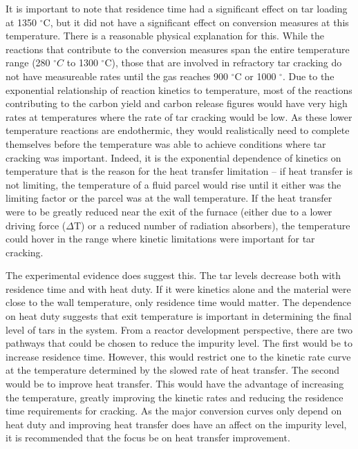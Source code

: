 \documentclass[11pt,twocolumn]{article}
\begin{document}
It is important to note that residence time had a significant effect on tar loading at 1350 $^\circ$C, but it did not have a significant effect on conversion measures at this temperature.  There is a reasonable physical explanation for this.  While the reactions that contribute to the conversion measures span the entire temperature range (280 $^{\circ}C$ to 1300 $^{\circ}$C), those that are involved in refractory tar cracking do not have measureable rates until the gas reaches 900 $^{\circ}$C or 1000 $^{\circ}$.  Due to the exponential relationship of reaction kinetics to temperature, most of the reactions contributing to the carbon yield and carbon release figures would have very high rates at temperatures where the rate of tar cracking would be low.  As these lower temperature reactions are endothermic, they would realistically need to complete themselves before the temperature was able to achieve conditions where tar cracking was important.  Indeed, it is the exponential dependence of kinetics on temperature that is the reason for the heat transfer limitation -- if heat transfer is not limiting, the temperature of a fluid parcel would rise until it either was the limiting factor or the parcel was at the wall temperature.  If the heat transfer were to be greatly reduced near the exit of the furnace (either due to a lower driving force ($\Delta$T) or a reduced number of radiation absorbers), the temperature could hover in the range where kinetic limitations were important for tar cracking.  

The experimental evidence does suggest this.  The tar levels decrease both with residence time and with heat duty.  If it were kinetics alone and the material were close to the wall temperature, only residence time would matter.  The dependence on heat duty suggests that exit temperature is important in determining the final level of tars in the system.  From a reactor development perspective, there are two pathways that could be chosen to reduce the impurity level.  The first would be to increase residence time.  However, this would restrict one to the kinetic rate curve at the temperature determined by the slowed rate of heat transfer.  The second would be to improve heat transfer.  This would have the advantage of increasing the temperature, greatly improving the kinetic rates and reducing the residence time requirements for cracking.  As the major conversion curves only depend on heat duty and improving heat transfer does have an affect on the impurity level, it is recommended that the focus be on heat transfer improvement. 
\end{document}
